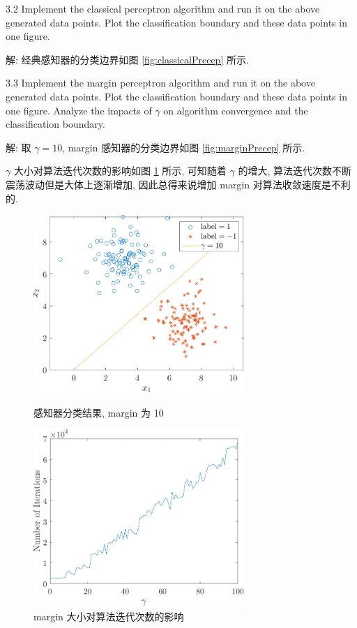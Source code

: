 \documentclass{article}
\begin{document}
3.2 Implement the classical perceptron algorithm and run it on the above generated data points. Plot the classification boundary and these data points in one figure.

解: 经典感知器的分类边界如图 \ref{fig:classicalPrecep} 所示.

3.3 Implement the margin perceptron algorithm and run it on the above generated data points. Plot the classification boundary and these data points in one figure. Analyze the impacts of $\gamma$ on algorithm convergence and the classification boundary.

解: 取 $\gamma=10$, margin 感知器的分类边界如图 \ref{fig:marginPrecep} 所示. 

$\gamma$ 大小对算法迭代次数的影响如图 \ref{fig:marginEffect} 所示, 可知随着 $\gamma$ 的增大, 算法迭代次数不断震荡波动但是大体上逐渐增加, 因此总得来说增加 margin 对算法收敛速度是不利的.

\begin{figure}[htbp]
  \centering
  \begin{minipage}[t]{0.48\textwidth}
  \centering
  \includegraphics[width=8cm]{marginPrecep.pdf}
  \caption{感知器分类结果, margin 为 10}
  \label{fig:marginPrecep}
  \end{minipage}
  \begin{minipage}[t]{0.48\textwidth}
  \centering
  \includegraphics[width=8cm]{marginEffect.pdf}
  \caption{margin 大小对算法迭代次数的影响}
  \label{fig:marginEffect}
  \end{minipage}
\end{figure}
\end{document}
